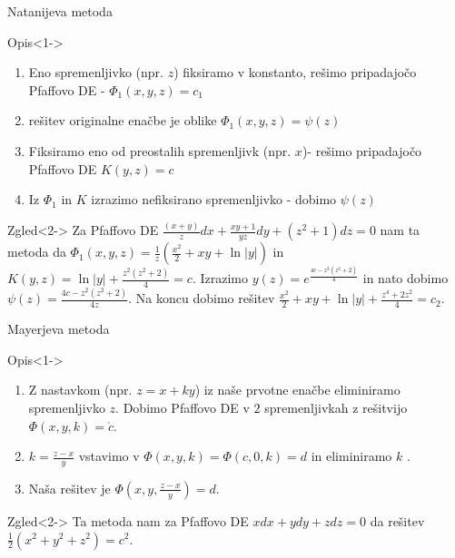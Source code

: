 \documentclass[t, 10pt]{beamer} %
\newcommand{\abs}[1]{\ensuremath{\lvert #1 \rvert}}
\newcommand{\fillblack}[1]{
	\begin{tikzpicture}[remember picture, overlay]
		\node [shift={(0 cm,0cm)}]  at (current page.south west)
		{%
			\begin{tikzpicture}[remember picture, overlay] at (current page.south west)
				\draw [fill=black] (0, 0) -- (0,#1 \paperheight) --
				(\paperwidth,#1 \paperheight) -- (\paperwidth,0) -- cycle ;
			\end{tikzpicture}
		};
		\draw (current page.north west) rectangle (current page.south east);
	\end{tikzpicture}
}
\begin{document}
		\begin{frame}{Natanijeva metoda}
			\begin{block}{Opis}<1->
				\begin{enumerate}
					\item Eno spremenljivko (npr. $z$) fiksiramo v konstanto, rešimo pripadajočo Pfaffovo DE - $\Phi_1(x, y, z) = c_1$
					\item rešitev originalne enačbe je oblike $\Phi_1(x, y, z) = \psi(z)$
					\item Fiksiramo eno od preostalih spremenljivk (npr. $x$)- rešimo pripadajočo Pfaffovo DE $K(y, z) = c$
					\item Iz $\Phi_1$ in $K$ izrazimo nefiksirano spremenljivko - dobimo $\psi(z)$
				\end{enumerate}
			\end{block}
			\begin{block}{Zgled}<2->
				Za Pfaffovo DE $\frac{(x+y)}{z}dx + \frac{xy+1}{yz}dy + (z^2 + 1)dz = 0$ nam ta metoda da $\Phi_1(x, y, z) =\frac{1}{z}(\frac{x^2}{2} + xy + \ln\abs{y})$ in $K(y, z) = \ln\abs{y} + \frac{z^2(z^2 + 2)}{4}=c$. Izrazimo $y(z) = e^{\frac{4c - z^2(z^2 + 2)}{4}}$ in nato dobimo $\psi(z) = \frac{4c - z^2(z^2 + 2)}{4z}$. Na koncu dobimo rešitev $\frac{x^2}{2} + xy + \ln\abs{y} + \frac{z^4 + 2z^2}{4} = c_2$.
			\end{block}
		\end{frame}
		
		\begin{frame}{Mayerjeva metoda}
			\begin{block}{Opis}<1->
			\begin{enumerate}
				\item Z nastavkom (npr. $z = x + ky$) iz naše prvotne enačbe eliminiramo spremenljivko $z$. Dobimo Pfaffovo DE v $2$ spremenljivkah z rešitvijo $\Phi(x, y, k) = \acute{c}$.
				\item $k = \frac{z - x}{y}$ vstavimo v $\Phi(x, y, k) = \Phi(c, 0, k) = d$ in eliminiramo $k$ .
				\item Naša rešitev je $\Phi(x, y, \frac{z - x}{y}) = d$.
			\end{enumerate}
			\end{block}
			\begin{block}{Zgled}<2->
				Ta metoda nam za Pfaffovo DE $xdx + ydy + zdz = 0$ da rešitev $\frac{1}{2}(x^2 + y^2 + z^2) = c^2$.
			\end{block}
		\end{frame}
		
\end{document}
